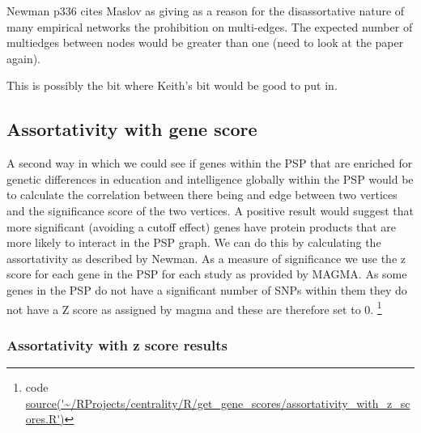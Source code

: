  


Newman \cite{newman2018networks} p336 cites Maslov \cite{maslov2004detection} as giving as a reason for the disassortative nature of many empirical networks the prohibition on multi-edges. The expected number of multiedges between nodes would be greater than one (need to look at the paper again).

This is possibly the bit where Keith's bit would be good to put in.  
%
%
%

\subsection{Assortativity with gene score}
 
A second way in which we could see if genes within the PSP that are enriched for genetic differences in education and intelligence globally within the PSP would be to calculate the correlation between there being and edge between two vertices and the significance score of the two vertices. A positive result would suggest that more significant (avoiding a cutoff effect) genes have protein products that are more likely to interact in the PSP graph. We can do this by calculating the assortativity as described by Newman. As a measure of significance we use the z score for each gene in the PSP for each study as provided by MAGMA. As some genes in the PSP do not have a significant number of SNPs within them they do not have a Z score as assigned by magma and these are therefore set to 0. \footnote{code \url{source('~/RProjects/centrality/R/get_gene_scores/assortativity_with_z_scores.R')} }

\subsubsection{Assortativity with z score results}
 
